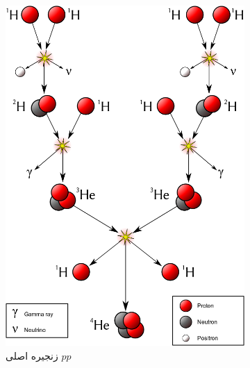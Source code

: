 \documentclass[a4paper,11pt,oneside,openany]{iut-thesis}
\begin{document}
\begin{figure}
	\begin{subfigure}[b]{.33\linewidth}
		\includegraphics[width=\linewidth]{pp1}
		\caption{
	زنجیره اصلی $pp$	
	}
	\end{subfigure}%
	\begin{subfigure}[b]{.33\linewidth}

\end{subfigure}
\end{figure}
\end{document}
